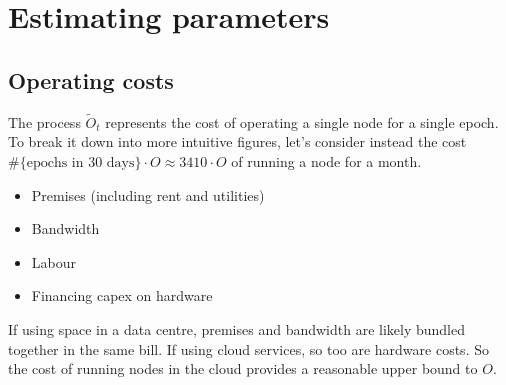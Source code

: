 \newpage
\section{Estimating parameters}

\subsection{Operating costs}

The process $\tilde{O}_t$ represents the cost of operating a single node for a single epoch.
%
To break it down into more intuitive figures, let's consider instead the cost $\#\{\text{epochs in 30 days}\}\cdot O\approx 3410\cdot O$ of running a node for a month.

\begin{itemize}
  \item Premises (including rent and utilities)
  \item Bandwidth
  \item Labour
  \item Financing capex on hardware
\end{itemize}
If using space in a data centre, premises and bandwidth are likely bundled together in the same bill.
%
If using cloud services, so too are hardware costs.
%
So the cost of running nodes in the cloud provides a reasonable upper bound to $O$.